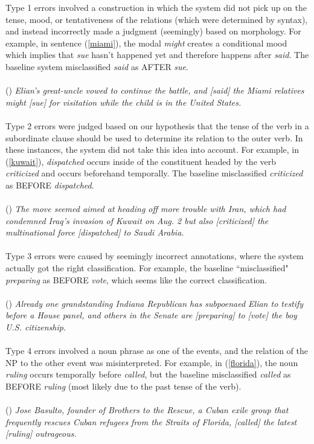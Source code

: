 \documentclass[11pt]{article}
\begin{document}
Type 1 errors involved a construction in which the system did not pick up on the tense, mood, or tentativeness of the relations (which were determined by syntax), and instead incorrectly made a judgment (seemingly) based on morphology. For example, in sentence (\ref{miami}), the modal \emph{might} creates a conditional mood which implies that \emph{sue} hasn't happened yet and therefore happens after \emph{said}. The baseline system misclassified \emph{said} as AFTER \emph{sue}.\\\\
(\exampleno) \label{miami} \emph{Elian's great-uncle vowed to continue the battle, and [said] the Miami relatives might [sue] for visitation while the child is in the United States.}\\\\

Type 2 errors were judged based on our hypothesis that the tense of the verb in a subordinate clause should be used to determine its relation to the outer verb. In these instances, the system did not take this idea into account. For example, in (\ref{kuwait}), \emph{dispatched} occurs inside of the constituent headed by the verb \emph{criticized} and occurs beforehand temporally. The baseline misclassified \emph{criticized} as BEFORE \emph{dispatched}.\\\\
(\exampleno) \label{kuwait} \emph{The move seemed aimed at heading off more trouble with Iran, which had condemned Iraq's invasion of Kuwait on Aug. 2 but also [criticized] the multinational force [dispatched] to Saudi Arabia.}\\\\

Type 3 errors were caused by seemingly incorrect annotations, where the system actually got the right classification. For example, the baseline ``misclassified" \emph{preparing} as BEFORE \emph{vote}, which seems like the correct classification.\\\\
(\exampleno) \label{vote} \emph{Already one grandstanding Indiana Republican has subpoenaed Elian to testify before a House panel, and others in the Senate are [preparing] to [vote] the boy U.S. citizenship.}\\\\

Type 4 errors involved a noun phrase as one of the events, and the relation of the NP to the other event was misinterpreted. For example, in (\ref{florida}), the noun \emph{ruling} occurs temporally before \emph{called}, but the baseline misclassified \emph{called} as BEFORE \emph{ruling} (most likely due to the past tense of the verb).\\\\
(\exampleno) \label{florida} \emph{Jose Basulto, founder of Brothers to the Rescue, a Cuban exile group that frequently rescues Cuban refugees from the Straits of Florida, [called] the latest [ruling] outrageous.}\\\\
\end{document}
